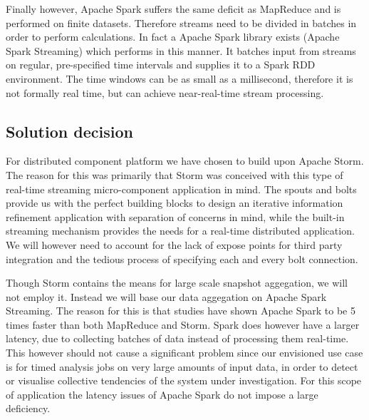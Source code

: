 Finally however, Apache Spark suffers the same deficit as MapReduce and is performed on finite datasets. Therefore streams need to be divided in batches in order to perform calculations. In fact a Apache Spark library exists (Apache Spark Streaming\cite{web:spark_streaming}) which performs in this manner. It batches input from streams on regular, pre-specified time intervals and supplies it to a Spark RDD environment. The time windows can be as small as a millisecond, therefore it is not formally real time, but can achieve near-real-time stream processing.



\subsection{Solution decision}
\label{sec:solution_decision}
For distributed component platform we have chosen to build upon Apache Storm. The reason for this was primarily that Storm was conceived with this type of real-time streaming micro-component application in mind. The spouts and bolts provide us with the perfect building blocks to design an iterative information refinement application with separation of concerns in mind, while the built-in streaming mechanism provides the needs for a real-time distributed application. We will however need to account for the lack of expose points for third party integration and the tedious process of specifying each and every bolt connection.

Though Storm contains the means for large scale snapshot aggegation, we will not employ it. Instead we will base our data aggegation on Apache Spark Streaming. The reason for this is that studies have shown Apache Spark to be 5 times faster than both MapReduce\cite{spark-vs-mapreduce} and Storm\cite{spark-vs-storm}. Spark does however have a larger latency, due to collecting batches of data instead of processing them real-time. This however should not cause a significant problem since our envisioned use case is for timed analysis jobs on very large amounts of input data, in order to detect or visualise collective tendencies of the system under investigation. For this scope of application the latency issues of Apache Spark do not impose a large deficiency.

